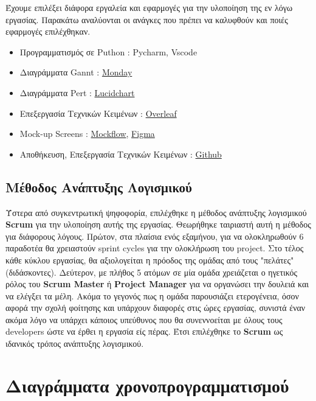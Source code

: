 \documentclass{article}
\begin{document}
Έχουμε επιλέξει διάφορα εργαλεία και εφαρμογές για την υλοποίηση της εν λόγω εργασίας. Παρακάτω αναλύονται οι ανάγκες που πρέπει να καλυφθούν και ποιές εφαρμογές επιλέχθηκαν.


\begin{itemize}
    \item Προγραμματισμός σε Puthon : Pycharm, Vscode
    \item Διαγράμματα Gannt : \href{https://www.monday.com}{Monday}
    \item Διαγράμματα Pert : \href{https://lucid.app}{Lucidchart}
    \item Επεξεργασία Τεχνικών Κειμένων : \href{https://www.overleaf.com}{Overleaf}
    \item Mock-up Screens : \href{https://www.mockflow.com/}{Mockflow}, \href{https://www.figma.com}{Figma}
    \item Αποθήκευση, Επεξεργασία Τεχνικών Κειμένων : \href{https://github.com/}{Github}
\end{itemize}
 

\subsection{Μέθοδος Ανάπτυξης Λογισμικού}

Ύστερα από συγκεντρωτική ψηφοφορία, επιλέχθηκε η μέθοδος ανάπτυξης λογισμικού \textbf{Scrum} για την υλοποίηση αυτής της εργασίας. Θεωρήθηκε ταιριαστή αυτή η μέθοδος για διάφορους λόγους. Πρώτον, στα πλαίσια ενός εξαμήνου, για να ολοκληρωθούν 6 παραδοτέα θα χρειαστούν sprint cycles για την ολοκλήρωση του project. Στο τέλος κάθε κύκλου εργασίας, θα αξιολογείται η πρόοδος της ομάδας από τους "πελάτες" (διδάσκοντες). Δεύτερον, με πλήθος 5 ατόμων σε μία ομάδα χρειάζεται ο ηγετικός ρόλος του \textbf{Scrum Master} ή \textbf{Project Manager} για να οργανώσει την δουλειά και να ελέγξει τα μέλη. Ακόμα το γεγονός πως η ομάδα παρουσιάζει ετερογένεια, όσον αφορά την σχολή φοίτησης και υπάρχουν διαφορές στις ώρες εργασίας, συνιστά έναν ακόμα λόγο να υπάρχει κάποιος υπεύθυνος που θα συνεννοείται με όλους τους developers ώστε να έρθει η εργασία είς πέρας. Έτσι επιλέχθηκε το \textbf{Scrum} ως ιδανικός τρόπος ανάπτυξης λογισμικού.

\newpage

\section{Διαγράμματα χρονοπρογραμματισμού}
\end{document}
